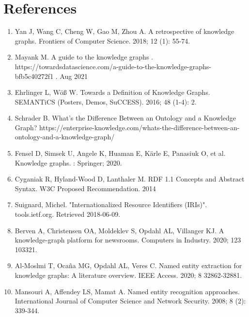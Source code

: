 \section{References}

\begin{enumerate}

     \item \hypertarget{1}{Yan J, Wang C, Cheng W, Gao M, Zhou A. A retrospective of knowledge graphs. Frontiers of Computer Science. 2018; 12 (1): 55-74.}
    
    \item \hypertarget{2}{ Mayank M. A guide to the knowledge graphs . https://towardsdatascience.com/a-guide-to-the-knowledge-graphs-bfb5c40272f1 . Aug 2021}
        
    \item \hypertarget{3}{Ehrlinger L, Wöß W. Towards a Definition of Knowledge Graphs. SEMANTiCS (Posters, Demos, SuCCESS). 2016; 48 (1-4): 2.}
    
    \item \hypertarget{4}{Schrader B. What’s the Difference Between an
Ontology and a Knowledge Graph? https://enterprise-knowledge.com/whats-the-difference-between-an-ontology-and-a-knowledge-graph/}

    \item \hypertarget{5}{Fensel D, Simsek U, Angele K, Huaman E, Kärle E, Panasiuk O, et al. Knowledge graphs. : Springer; 2020.}
    
     \item \hypertarget{6}{Cyganiak R, Hyland-Wood D, Lanthaler M. RDF 1.1 Concepts and Abstract Syntax. W3C Proposed Recommendation. 2014}

    \item \hypertarget{7}{Suignard, Michel. "Internationalized Resource Identifiers (IRIs)". tools.ietf.org. Retrieved 2018-06-09.}
 
    \item \hypertarget{8}{Berven A, Christensen OA, Moldeklev S, Opdahl AL, Villanger KJ. A knowledge-graph platform for newsrooms. Computers in Industry. 2020; 123 103321.}
 
    \item \hypertarget{9}{Al-Moslmi T, Ocaña MG, Opdahl AL, Veres C. Named entity extraction for knowledge graphs: A literature overview. IEEE Access. 2020; 8 32862-32881.}
    
    \item \hypertarget{10}{Mansouri A, Affendey LS, Mamat A. Named entity recognition approaches. International Journal of Computer Science and Network Security. 2008; 8 (2): 339-344.}
   

\end{enumerate}
